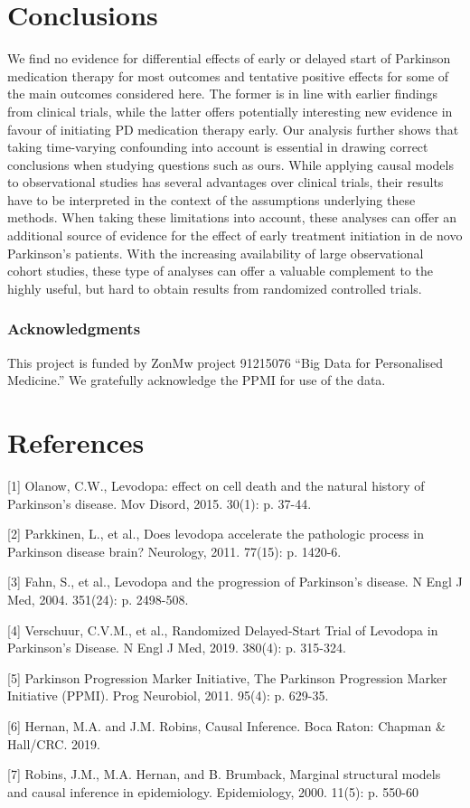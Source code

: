 \documentclass[final]{article}
\begin{document}
\section*{Conclusions}
We find no evidence for differential effects of early or delayed start of Parkinson medication therapy for most outcomes and tentative positive effects for some of the main outcomes considered here. The former is in line with earlier findings from clinical trials, while the latter offers potentially interesting new evidence in favour of initiating PD medication therapy early. Our analysis further shows that taking time-varying confounding into account is essential in drawing correct conclusions when studying questions such as ours. 
While applying causal models to observational studies has several advantages over clinical trials, their results have to be interpreted in the context of the assumptions underlying these methods. When taking these limitations into account, these analyses can offer an additional source of evidence for the effect of early treatment initiation in de novo Parkinson's patients. With the increasing availability of large observational cohort studies, these type of analyses can offer a valuable complement to the highly useful, but hard to obtain results from randomized controlled trials.

\subsubsection*{Acknowledgments}
This project is funded by ZonMw project 91215076 “Big Data for Personalised Medicine.” We gratefully acknowledge the PPMI for use of the data.

\section*{References}

[1] Olanow, C.W., Levodopa: effect on cell death and the natural history of Parkinson's disease. Mov Disord, 2015. 30(1): p. 37-44.

[2] Parkkinen, L., et al., Does levodopa accelerate the pathologic process in Parkinson disease brain? Neurology, 2011. 77(15): p. 1420-6.

[3] Fahn, S., et al., Levodopa and the progression of Parkinson's disease. N Engl J Med, 2004. 351(24): p. 2498-508.

[4] Verschuur, C.V.M., et al., Randomized Delayed-Start Trial of Levodopa in Parkinson's Disease. N Engl J Med, 2019. 380(4): p. 315-324.

[5] Parkinson Progression Marker Initiative, The Parkinson Progression Marker Initiative (PPMI). Prog Neurobiol, 2011. 95(4): p. 629-35.

[6] Hernan, M.A. and J.M. Robins, Causal Inference. Boca Raton: Chapman \& Hall/CRC. 2019.

[7] Robins, J.M., M.A. Hernan, and B. Brumback, Marginal structural models and causal inference in epidemiology. Epidemiology, 2000. 11(5): p. 550-60
\end{document}
